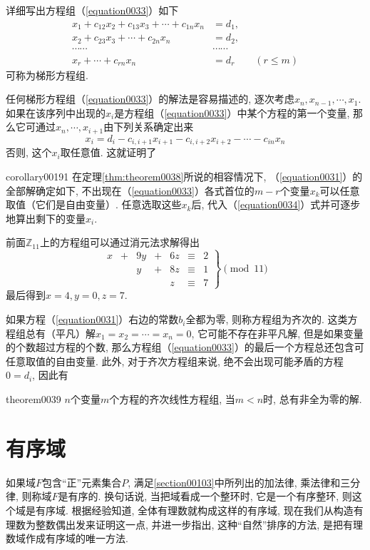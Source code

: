 详细写出方程组（\ref{equation0033}）如下
\begin{equation}\label{equation0034}
\begin{aligned}
x_1+c_{12}x_2+c_{13}x_3+\cdots+c_{1n}x_n&=d_1,\\
x_2+c_{23}x_3+\cdots+c_{2n}x_n&=d_2,\\
\cdots\cdots&\cdots\cdots\\
x_r+\cdots+c_{rn}x_n&=d_r\qquad(r \le m)
\end{aligned}
\end{equation}
可称为梯形方程组. 

任何梯形方程组（\ref{equation0033}）的解法是容易描述的, 逐次考虑$x_{n}, x_{n-1}, \cdots, x_1$. 如果在该序列中出现的$x_i$是方程组（\ref{equation0033}）中某个方程的第一个变量, 那么它可通过$x_n,\cdots, x_{i+1}$由下列关系确定出来
\[
x_i = d_i - c_{i,i+1}x_{i+1}-c_{i,i+2}x_{i+2}-\cdots-c_{in}x_n
\]
否则, 这个$x_i$取任意值. 这就证明了
\begin{corollary}{}{corollary00191}
在定理\ref{thm:theorem0038}所说的相容情况下, （\ref{equation0031}）的全部解确定如下, 不出现在（\ref{equation0033}）各式首位的$m-r$个变量$x_k$可以任意取值（它们是自由变量）. 任意选取这些$x_k$后, 代入（\ref{equation0034}）式并可逐步地算出剩下的变量$x_i$. 
\end{corollary}

前面$\mathbb{Z}_11$上的方程组可以通过消元法求解得出
\[
\left.
\begin{array}{rcrcrcl}
x&+&9y&+&6z&\equiv&2\\
&&y&+&8z&\equiv&1\\
&&&&z&\equiv&7
\end{array}
\right\}\pmod{11}
\]
最后得到$x=4,y=0,z=7$. 


如果方程（\ref{equation0031}）右边的常数$b_i$全都为零, 则称方程组为齐次的. 这类方程组总有（平凡）解$x_1=x_2=\cdots=x_n=0$, 它可能不存在非平凡解, 但是如果变量的个数超过方程的个数, 那么方程组（\ref{equation0033}）的最后一个方程总还包含可任意取值的自由变量. 此外, 对于齐次方程组来说, 绝不会出现可能矛盾的方程$0=d_i$, 因此有
\begin{theorem}{}{theorem0039}
$n$个变量$m$个方程的齐次线性方程组, 当$m < n$时, 总有非全为零的解. 
\end{theorem}

\section{有序域}
如果域$F$包含“正”元素集合$P$, 满足\ref{section00103}中所列出的加法律, 乘法律和三分律, 则称域$F$是有序的. 换句话说, 当把域看成一个整环时, 它是一个有序整环, 则这个域是有序域. 根据经验知道, 全体有理数就构成这样的有序域, 现在我们从构造有理数为整数偶出发来证明这一点, 并进一步指出, 这种“自然”排序的方法, 是把有理数域作成有序域的唯一方法. 

